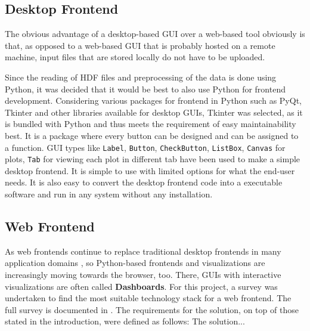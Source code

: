 \subsection{Desktop Frontend}
\label{sec:desktop-frontend}

The obvious advantage of a desktop-based GUI over a web-based tool obviously is
that, as opposed to a web-based GUI that is probably hosted on a remote machine,
input files that are stored locally do not have to be uploaded. 

Since the reading of HDF files and preprocessing of the data is done using
Python, it was decided that it would be best to also use Python for frontend
development. Considering various packages for frontend in Python such as PyQt,
Tkinter and other libraries available for desktop GUIs, Tkinter was selected, as
it is bundled with Python and thus meets the requirement of easy maintainability
best. It is a package where every button can be designed and can be assigned to
a function. GUI types like \texttt{Label}, \texttt{Button},
\texttt{CheckButton}, \texttt{ListBox}, \texttt{Canvas} for plots, \texttt{Tab}
for viewing each plot in different tab have been used to make a simple desktop
frontend. It is simple to use with limited options for what the end-user needs.
It is also easy to convert the desktop frontend code into a executable software
and run in any system without any installation.

\subsection{Web Frontend}
\label{sec:web-frontend}

As web frontends continue to replace traditional desktop frontends in many
application domains \cite{web-vs-desktop}, so Python-based frontends and
visualizations are increasingly moving towards the browser, too. There, GUIs
with interactive visualizations are often called \textbf{Dashboards}. For this
project, a survey was undertaken to find the most suitable technology stack for
a web frontend. The full survey is documented in \cite{jw-notes}. The
requirements for the solution, on top of those stated in the introduction, were
defined as follows: The solution...

